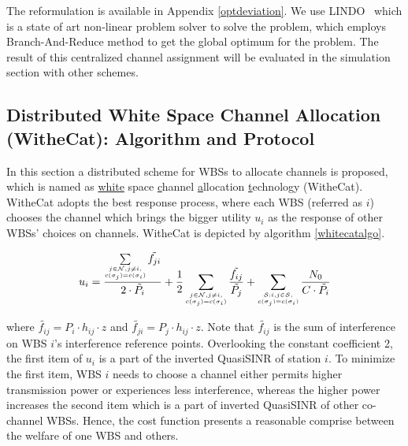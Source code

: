 The reformulation is available in Appendix \ref{optdeviation}.
We use LINDO~\cite{lindo} which is a state of art non-linear problem solver to solve the problem, which employs Branch-And-Reduce method to get the global optimum for the problem. %
The result of this centralized channel assignment will be evaluated in the simulation section with other schemes. 



\subsection{Distributed White Space Channel Allocation (WitheCat): Algorithm and Protocol}
\label{whitecat}
In this section a distributed scheme for WBSs to allocate channels is proposed, which is named as \underline{white} space \underline{c}hannel \underline{a}llocation \underline{t}echnology (WitheCat). 
WitheCat adopts the best response process, where each WBS (referred as $i$) chooses the channel which brings the bigger utility $u_i$ as the response of other WBSs' choices on channels.
WitheCat is depicted by algorithm \ref{whitecatalgo}.

\begin{equation}
\label{utility}
u_i =\dfrac{\sum\limits_{\tiny\substack{j\in \mathcal{N}, j\ne i,\\ c(\sigma_j)=c(\sigma_i)}}\tilde{f_{ji}}}{2\cdot \tilde{P_i}} + \dfrac{1}{2}\sum_{\tiny\substack{j\in \mathcal{N}, j\ne i,\\ c(\sigma_j)=c(\sigma_i)}}\dfrac{\tilde{f_{ij}}}{\tilde{P_j}} + \sum_{\tiny\substack{\mathcal{S}:i,j\in \mathcal{S},\\ c(\sigma_j)=c(\sigma_i)}}\dfrac{N_0}{C\cdot \tilde{P_i}}\\
\end{equation}

where $\tilde{f_{ij}}= P_i\cdot h_{ij}\cdot z$ and $\tilde{f_{ji}}= P_j\cdot h_{ij}\cdot z$.
Note that $\tilde{f_{ij}}$ is the sum of interference on WBS $i$'s interference reference points.
Overlooking the constant coefficient 2, the first item of $u_i$ is a part of the inverted QuasiSINR of station $i$. 
To minimize the first item, WBS $i$ needs to choose a channel either permits higher transmission power or experiences less interference, whereas the higher power increases the second item which is a part of inverted QuasiSINR of other co-channel WBSs. 
Hence, the cost function presents a reasonable comprise between the welfare of one WBS and others.

